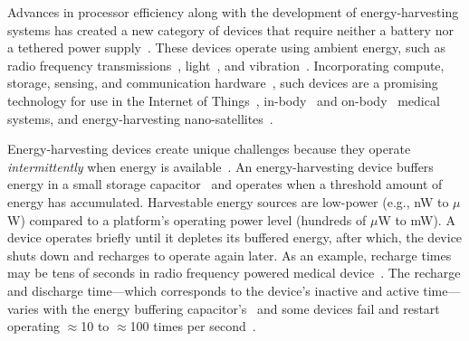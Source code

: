 


Advances in processor efficiency along with the development of
energy-harvesting systems has created a new category of devices that require
neither a battery nor a tethered power
supply~\citep{prasad_comst_2014,lucia_snapl_2017,soyata_csm_2016}. These
devices operate using ambient energy, such as radio frequency
transmissions~\citep{rf_powered_computing_gollakota_2014},
light~\citep{margolies_infocom_2016,margolies_tosn_2016}, and
vibration~\citep{gorlatova_sigmetrics_2014}. Incorporating compute, storage,
sensing, and communication hardware~\citep{wisp5,moo,capybara}, such devices are a
promising technology for use in the Internet of Things~\citep{ku_cst_2016},
in-body~\citep{nadeau_naturebio_2017} and
on-body~\citep{bandodkar_electroanalysis_2015} medical systems, and
energy-harvesting nano-satellites~\citep{kicksat,capybara}.

Energy-harvesting devices create unique challenges because they operate {\em
intermittently} when energy is
available~\citep{hicks_isca_2017,lucia_snapl_2017}. An energy-harvesting device
buffers energy in a small storage capacitor~\citep{gorlatova_tmc_2013,gunduz_commag_2014} and operates when a
threshold amount of energy has accumulated. Harvestable energy sources are low-power (e.g., nW to $\mu$W) compared to a platform's operating
power level (hundreds of $\mu$W to mW). A device operates briefly until it depletes its buffered energy, after which, the device shuts
down and recharges to operate again later. As an example, recharge times may be
tens of seconds in radio frequency powered medical device~\cite[Fig.
3c]{nadeau_naturebio_2017}.  The recharge and discharge time---which corresponds to the device's inactive and active time---varies with the energy buffering capacitor's~\cite{capybara} and some devices fail and restart operating $\approx$10 to
$\approx$100 times per second~\citep{tan_infocom_2016,mementos,nvp}.

